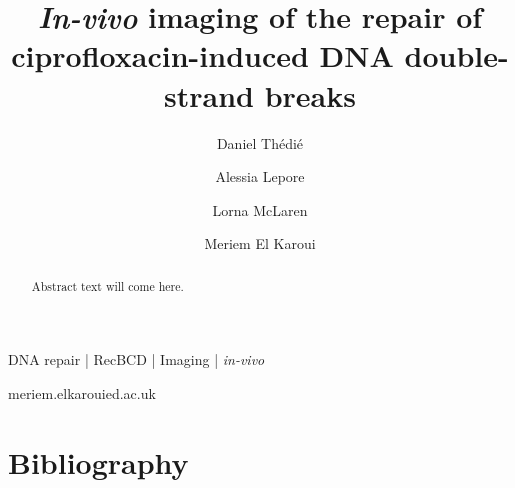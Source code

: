 \documentclass[times, twoside]{zHenriquesLab-StyleBioRxiv}
\begin{document}
\title{\emph{In-vivo} imaging of the repair of ciprofloxacin-induced DNA double-strand breaks}
\shorttitle{}

\author[1]{Daniel Thédié}
\author[2]{Alessia Lepore}
\author[1]{Lorna McLaren}
\author[1]{Meriem El Karoui}



\maketitle

\begin{abstract}
Abstract text will come here.
\end{abstract}

\begin{keywords}
DNA repair | RecBCD | Imaging | \emph{in-vivo}
\end{keywords}

\begin{corrauthor}
meriem.elkaroui\at ed.ac.uk
\end{corrauthor}













\begin{acknowledgements}
\end{acknowledgements}

\section*{Bibliography}


\onecolumn
\newpage


\end{document}
